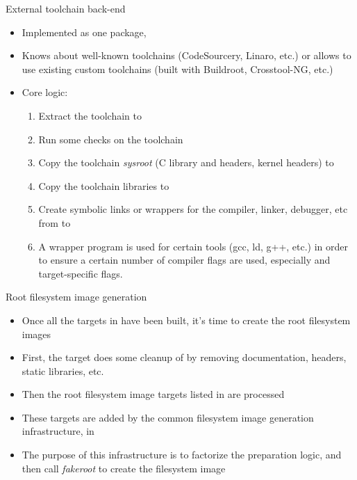 \begin{frame}{External toolchain back-end}
  \begin{itemize}
  \item Implemented as one package, 
  \item Knows about well-known toolchains (CodeSourcery, Linaro, etc.)
    or allows to use existing custom toolchains (built with Buildroot,
    Crosstool-NG, etc.)
  \item Core logic:
    \begin{enumerate}
      \scriptsize
    \item Extract the toolchain to 
    \item Run some checks on the toolchain
    \item Copy the toolchain {\em sysroot} (C library and headers,
      kernel headers) to 
    \item Copy the toolchain libraries to 
    \item Create symbolic links or wrappers for the compiler, linker,
      debugger, etc from  to
    \item A wrapper program is used for certain tools (gcc, ld, g++,
      etc.) in order to ensure a certain number of compiler flags are
      used, especially  and
      target-specific flags.
    \end{enumerate}
  \end{itemize}
\end{frame}

\begin{frame}{Root filesystem image generation}
  \begin{itemize}
  \item Once all the targets in  have been built,
    it's time to create the root filesystem images
  \item First, the  target does some cleanup of
     by removing documentation, headers, static
    libraries, etc.
  \item Then the root filesystem image targets listed in
     are processed
  \item These targets are added by the common filesystem image
    generation infrastructure, in 
  \item The purpose of this infrastructure is to factorize the
    preparation logic, and then call {\em fakeroot} to create the
    filesystem image
  \end{itemize}
\end{frame}

